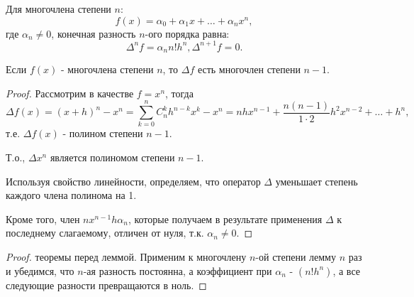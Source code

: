 \begin{theorem}
  Для многочлена степени $n$:
  \begin{equation*}
    f(x) = \alpha_0 + \alpha_1 x + \ldots + \alpha_n x^n,
  \end{equation*}
  где $\alpha_n \ne 0$, конечная разность $n$-ого порядка равна:
  \begin{equation*}
    \Delta^n f = \alpha_n n! h^n, \Delta^{n+1} f = 0.
  \end{equation*} 
\end{theorem}

\begin{lemma}
  Если $f(x)$ - многочлена степени $n$, то $\Delta f$ есть многочлен степени $n-1$.
\end{lemma}
\begin{proof}
  Рассмотрим в качестве $f = x^n$, тогда
  \begin{equation*}
    \Delta f(x) = (x+h)^n - x^n = \sum\limits_{k=0}^n C_n^k h^{n-k}x^k - x^n = n h x^{n-1} + \dfrac{n (n-1)}{1 \cdot 2} h^2 x^{n-2} + \ldots + h^n,
  \end{equation*}
  т.е. $\Delta f(x)$ - полином степени $n-1$.

  Т.о., $\Delta x^n$ является полиномом степени $n-1$.

  Используя свойство линейности, определяем, что оператор $\Delta$ уменьшает степень каждого члена полинома на 1.

  Кроме того, член $n x^{n-1} h \alpha_n$, которые получаем в результате применения $\Delta$ к последнему слагаемому, отличен от нуля, т.к. $\alpha_n \ne 0$.
\end{proof}
\begin{proof}
  теоремы перед леммой. Применим к многочлену $n$-ой степени лемму $n$ раз и убедимся, что $n$-ая разность постоянна, а коэффициент при $\alpha_n$ - $\left(n! h^n \right)$, а все следующие разности превращаются в ноль.
\end{proof}
